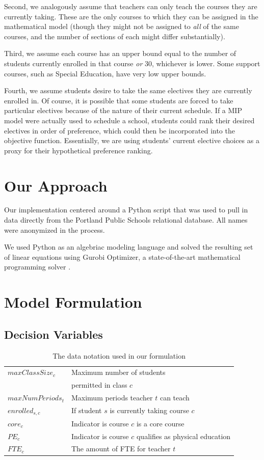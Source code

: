 \documentclass[12pt]{article}
\begin{document}
Second, we analogously assume that teachers can only teach the courses they are currently taking. These are the only courses to which they can be assigned in the mathematical model (though they might not be assigned to \textit{all} of the same courses, and the number of sections of each might differ substantially).

Third, we assume each course has an upper bound equal to the number of students currently enrolled in that course \textit{or} 30, whichever is lower. Some support courses, such as Special Education, have very low upper bounds.

Fourth, we assume students desire to take the same electives they are currently enrolled in. Of course, it is possible that some students are forced to take particular electives because of the nature of their current schedule. If a MIP model were actually used to schedule a school, students could rank their desired electives in order of preference, which could then be incorporated into the objective function. Essentially, we are using students' current elective choices as a proxy for their hypothetical preference ranking.


\section{Our Approach}

Our implementation centered around a Python script that was used to pull in data directly from the Portland Public Schools relational database. All names were anonymized in the process.

We used Python as an algebriac modeling language and solved the resulting set of linear equations using Gurobi Optimizer, a state-of-the-art mathematical programming solver \cite{gurobi}.


\section{Model Formulation}


\subsection{Decision Variables}

\begin{table}[]
\centering
\caption{The data notation used in our formulation}
\label{tab:data-notation}
\begin{tabular}{ll}
\hline
$maxClassSize_{c}$ & Maximum number of students \\
 & permitted in class $c$ \\
$maxNumPeriods_{t}$ & Maximum periods teacher $t$ can teach\\
$enrolled_{s,c}$ & If student $s$ is currently taking course $c$\\
$core_{c}$ & Indicator is course $c$ is a core course \\
$PE_{c}$ & Indicator is course $c$ qualifies as physical education \\
$FTE_{c}$ & The amount of FTE for teacher $t$ \\
\hline
\end{tabular}
\end{table}
\end{document}
